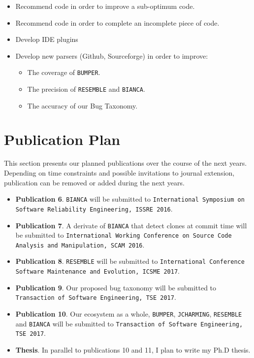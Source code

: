 \begin{itemize}
	\item Recommend code in order to improve a sub-optimum code.
	\item Recommend code in order to complete an incomplete piece of code.
	\item Develop IDE plugins
	\item Develop new parsers (Github, Sourceforge) in order to improve:
	\begin{itemize}
		\item The coverage of {\tt BUMPER}.
		\item The precision of {\tt RESEMBLE} and {\tt BIANCA}.
		\item The accuracy of our Bug Taxonomy.
	\end{itemize}
\end{itemize}

\section{Publication Plan\label{sec:publication-plan}}

This section presents our planned publications over the course of the next years.
Depending on time constraints and possible invitations to journal extension, publication can be removed or added during the next years.

\begin{itemize}

	\item {\bf Publication 6}. {\tt BIANCA} will be submitted to {\tt International Symposium on Software Reliability Engineering, ISSRE 2016}.
	\item {\bf Publication 7}. A derivate of {\tt BIANCA} that detect clones at commit time will be submitted to {\tt International Working Conference on Source Code Analysis and Manipulation, SCAM 2016}.
	\item {\bf Publication 8}. {\tt RESEMBLE} will be submitted to {\tt International Conference Software Maintenance and Evolution, ICSME 2017}.
	\item {\bf Publication 9}. Our proposed bug taxonomy will be submitted to {\tt Transaction of Software Engineering, TSE 2017}.
	\item {\bf Publication 10}. Our ecosystem as a whole, {\tt BUMPER}, {\tt JCHARMING}, {\tt RESEMBLE} and {\tt BIANCA} will be submitted to {\tt Transaction of Software Engineering, TSE 2017}.
	\item {\bf Thesis}. In parallel to publications 10 and 11, I plan to write my Ph.D thesis.
\end{itemize}
